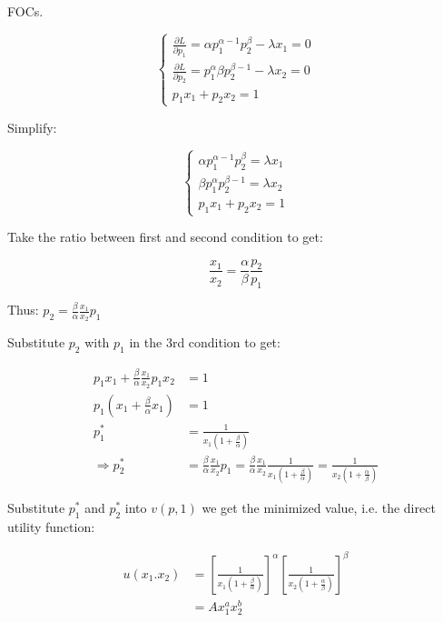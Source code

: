 \documentclass{article}
\begin{document}
FOCs.

\begin{equation}
    \begin{cases}
\frac{\partial L}{\partial p_1} = \alpha p_1^{\alpha - 1} p_2^\beta - \lambda x_1= 0 \\
\frac{\partial L}{\partial p_2} = p_1^{\alpha} \beta p_2^{\beta - 1} - \lambda x_2 = 0 \\
p_1x_1 + p_2x_2 = 1
    \end{cases}
    \nonumber
\end{equation}

Simplify:

\begin{equation}
    \begin{cases}
 \alpha p_1^{\alpha - 1} p_2^\beta = \lambda x_1 \\
 \beta  p_1^{\alpha}  p_2^{\beta - 1} = \lambda x_2  \\
p_1x_1 + p_2x_2 = 1
    \end{cases}
    \label{eq:2_3_foc}   
\end{equation}

Take the ratio between first and second condition to get:

$$\frac{x_1}{x_2} = \frac{\alpha}{\beta} \frac{p_2}{p_1}$$

Thus: $p_2 = \frac{\beta}{\alpha}\frac{x_1}{x_2} p_1 $

Substitute $p_2$ with $p_1$ in the 3rd condition to get:

\begin{align*}
p_1x_1 + \frac{\beta}{\alpha}\frac{x_1}{x_2} p_1  x_2 &= 1 \\
p_1(x_1 + \frac{\beta}{\alpha} x_1) &= 1 \\
p_1^* &= \frac{1}{x_1(1+ \frac{\beta}{\alpha})} \\
\Rightarrow p_2^* &= \frac{\beta}{\alpha} \frac{x_1}{x_2} p_1 =\frac{\beta}{\alpha} \frac{x_1}{x_2}\frac{1}{x_1(1+ \frac{\beta}{\alpha})} = \frac{1}{x_2(1+ \frac{\alpha}{\beta})}
\end{align*}

Substitute $p^*_1$ and $p^*_2$ into $v(p,1)$ we get the minimized value, i.e. the direct utility function:

\begin{align*}
u(x_1.x_2) &= [\frac{1}{x_1(1+ \frac{\beta}{\alpha})}]^\alpha[\frac{1}{x_2(1+ \frac{\alpha}{\beta})}]^\beta \\
 &= A x_1^a x_2^b
\end{align*}
\end{document}
